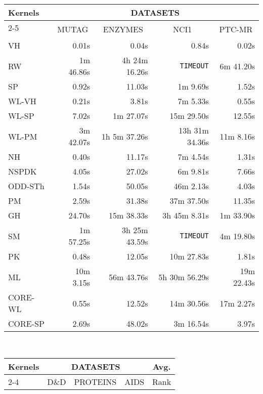 \documentclass[twoside,11pt]{article}
\begin{document}
\begin{table}[t]
\centering
\scriptsize
\begin{sc}
\def\arraystretch{1.1}
\begin{tabular}{lrrrr} \hline
\multirow{3}{*}{Kernels} & \multicolumn{4}{c}{DATASETS} \\ \cline{2-5}
& \multicolumn{1}{c}{\multirow{2}{*}{MUTAG}} & \multicolumn{1}{c}{\multirow{2}{*}{ENZYMES}} & \multicolumn{1}{c}{\multirow{2}{*}{NCI1}} & \multicolumn{1}{c}{\multirow{2}{*}{PTC-MR}} \\
& & & & \\ \hline
VH & 0.01s & 0.04s & 0.84s & 0.02s \\
RW & 1m 46.86s & 4h 24m 16.26s & \texttt{TIMEOUT} & 6m 41.20s \\
SP & 0.92s & 11.03s & 1m 9.69s & 1.52s \\
WL-VH & 0.21s & 3.81s & 7m 5.33s & 0.55s \\
WL-SP & 7.02s & 1m 27.07s & 15m 29.50s & 12.55s \\
WL-PM & 3m 42.07s & 1h 5m 37.26s & 13h 31m 34.36s & 11m 8.16s \\
NH & 0.40s & 11.17s & 7m 4.54s & 1.31s \\
NSPDK & 4.05s & 27.02s & 6m 9.81s & 7.66s \\
ODD-STh & 1.54s & 50.05s & 46m 2.13s & 4.03s \\
PM & 2.59s & 31.38s & 37m 37.50s & 11.35s \\
GH & 24.70s & 15m 38.33s & 3h 45m 8.31s & 1m 33.90s \\
SM & 1m 57.25s & 3h 25m 43.59s & \texttt{TIMEOUT} & 4m 19.80s \\
PK & 0.48s & 12.05s & 10m 27.83s & 1.81s \\
ML & 10m 3.15s & 56m 43.76s & 5h 30m 56.29s & 19m 22.43s \\
CORE-WL & 0.55s & 12.52s & 14m 30.56s & 17m 2.27s \\
CORE-SP & 2.69s & 48.02s & 3m 16.54s & 3.97s \\ \hline
\end{tabular}
\vspace{.2cm}
\\
\begin{tabular}{lrrrm{1.48cm}} \hline
\multirow{3}{*}{Kernels} & \multicolumn{3}{c}{DATASETS} & \multicolumn{1}{c}{\multirow{2}{*}{Avg.}} \\ \cline{2-4}
& \multicolumn{1}{c}{\multirow{2}{*}{D\&D}} & \multicolumn{1}{c}{\multirow{2}{*}{PROTEINS}} & \multicolumn{1}{c}{\multirow{2}{*}{AIDS}} & \multicolumn{1}{c}{\multirow{2}{*}{Rank}} \\ 

\end{tabular}
\end{sc}
\end{table}
\end{document}
